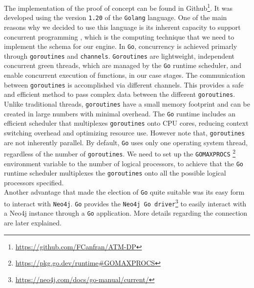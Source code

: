 The implementation of the proof of concept can be found in Github\footnote{\url{https://github.com/FCanfran/ATM-DP}}. It was developed using the version \texttt{1.20} of the \texttt{Golang} language. 
One of the main reasons why we decided to use this language is its inherent capacity to support concurrent programming \cite{Go-cbtnuggets_concurrency, Go-medium_concurrency, Go-reliasoftware_concurrency}, which is the computing technique that we need to implement the \DP schema for our \DPATM engine. In \texttt{Go}, concurrency is achieved primarly through \texttt{goroutines} and \texttt{channels}. \texttt{Goroutines} are lightweight, independent concurrent green threads, which are managed by the \texttt{Go} runtime scheduler, and enable concurrent execution of functions, in our case stages. The communication between \texttt{goroutines} is accomplished via different channels. This provides a safe and efficient method to pass complex data between the different \texttt{goroutines}. 
Unlike traditional threads, \texttt{goroutines} have a small memory footprint and can be created in large numbers with minimal overhead. The \texttt{Go} runtime includes an efficient scheduler that multiplexes \texttt{goroutines} onto CPU cores, reducing context switching overhead and optimizing resource use. However note that, \texttt{goroutines} are not inherently parallel. By default, \texttt{Go} uses only one operating system thread, regardless of the number of \texttt{goroutines}. We need to set up the \texttt{GOMAXPROCS} \footnote{\url{https://pkg.go.dev/runtime\#GOMAXPROCS}} environment variable to the number of logical processors, to achieve that the \texttt{Go} runtime scheduler multiplexes the \texttt{goroutines} onto all the possible logical processors specified.\\

Another advantage that made the election of \texttt{Go} quite suitable was its easy form to interact with \texttt{Neo4j}. \texttt{Go} provides the \texttt{Neo4j Go driver}\footnote{\url{https://neo4j.com/docs/go-manual/current/}} to easily interact with a Neo4j instance through a \texttt{Go} application. More details regarding the connection are later explained. 

